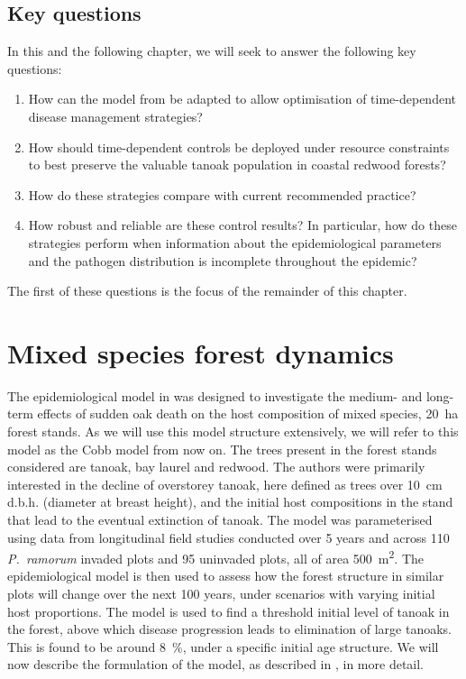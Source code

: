 \subsection{Key questions}

In this and the following chapter, we will seek to answer the following key questions:
\begin{enumerate}
    \item How can the model from \citet{cobb_ecosystem_2012} be adapted to allow optimisation of time-dependent disease management strategies?
    \item How should time-dependent controls be deployed under resource constraints to best preserve the valuable tanoak population in coastal redwood forests?
    \item How do these strategies compare with current recommended practice?
    \item How robust and reliable are these control results? In particular, how do these strategies perform when information about the epidemiological parameters and the pathogen distribution is incomplete throughout the epidemic?
\end{enumerate}
The first of these questions is the focus of the remainder of this chapter.

\newpage
{}\label{sec:ch5:CobbModel}
\section{Mixed species forest dynamics}

The epidemiological model in \citet{cobb_ecosystem_2012} was designed to investigate the medium- and long-term effects of sudden oak death on the host composition of mixed species, \SI{20}{\hectare} forest stands. As we will use this model structure extensively, we will refer to this model as the Cobb model from now on. The trees present in the forest stands considered are tanoak, bay laurel and redwood. The authors were primarily interested in the decline of overstorey tanoak, here defined as trees over \SI{10}{\cm} d.b.h. (diameter at breast height), and the initial host compositions in the stand that lead to the eventual extinction of tanoak. The model was parameterised using data from longitudinal field studies conducted over 5 years and across 110 \textit{P.~ramorum} invaded plots and 95 uninvaded plots, all of area \SI{500}{\metre\squared}. The epidemiological model is then used to assess how the forest structure in similar plots will change over the next 100 years, under scenarios with varying initial host proportions. The model is used to find a threshold initial level of tanoak in the forest, above which disease progression leads to elimination of large tanoaks. This is found to be around \SI{8}{\percent}, under a specific initial age structure. We will now describe the formulation of the model, as described in \citet{cobb_ecosystem_2012}, in more detail.

